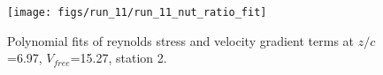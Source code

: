 \begin{figure}[H]
\centering
\texttt{[image: figs/run\_11/run\_11\_nut\_ratio\_fit]}
\caption{Polynomial fits of reynolds stress and velocity gradient terms at $z/c$=6.97, $V_{free}$=15.27, station 2.}
\label{fig:run_11_nut_ratio_fit}
\end{figure}


